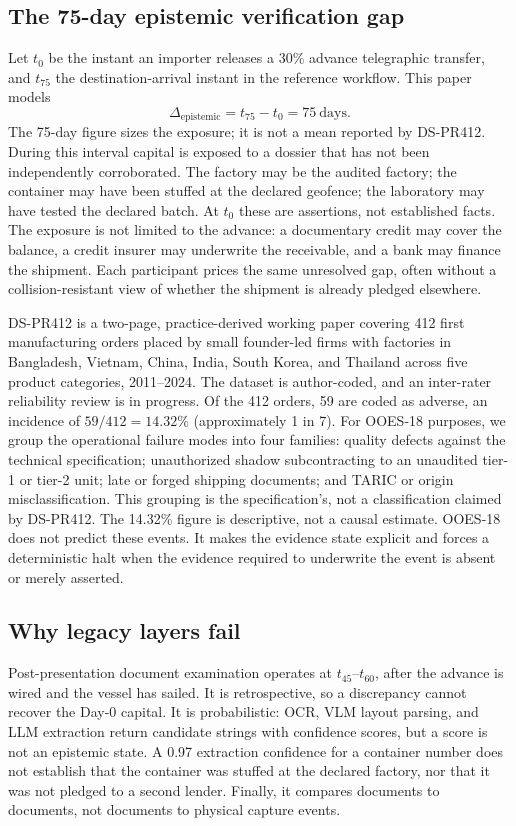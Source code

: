 \documentclass[10pt,twocolumn,a4paper]{article}
\begin{document}
\subsection{The 75-day epistemic verification gap}
Let $t_0$ be the instant an importer releases a 30\% advance telegraphic transfer, and $t_{75}$ the destination-arrival instant in the reference workflow. This paper models
\begin{equation}
\Delta_{\mathrm{epistemic}}=t_{75}-t_{0}=75\ \text{days}.
\end{equation}
The 75-day figure sizes the exposure; it is not a mean reported by DS-PR412. During this interval capital is exposed to a dossier that has not been independently corroborated. The factory may be the audited factory; the container may have been stuffed at the declared geofence; the laboratory may have tested the declared batch. At $t_0$ these are assertions, not established facts. The exposure is not limited to the advance: a documentary credit may cover the balance, a credit insurer may underwrite the receivable, and a bank may finance the shipment. Each participant prices the same unresolved gap, often without a collision-resistant view of whether the shipment is already pledged elsewhere.

DS-PR412 is a two-page, practice-derived working paper covering 412 first manufacturing orders placed by small founder-led firms with factories in Bangladesh, Vietnam, China, India, South Korea, and Thailand across five product categories, 2011--2024. The dataset is author-coded, and an inter-rater reliability review is in progress. Of the 412 orders, 59 are coded as adverse, an incidence of $59/412=14.32\%$ (approximately 1 in 7). For OOES-18 purposes, we group the operational failure modes into four families: quality defects against the technical specification; unauthorized shadow subcontracting to an unaudited tier-1 or tier-2 unit; late or forged shipping documents; and TARIC or origin misclassification. This grouping is the specification's, not a classification claimed by DS-PR412. The 14.32\% figure is descriptive, not a causal estimate. OOES-18 does not predict these events. It makes the evidence state explicit and forces a deterministic halt when the evidence required to underwrite the event is absent or merely asserted.

\subsection{Why legacy layers fail}
Post-presentation document examination operates at $t_{45}$--$t_{60}$, after the advance is wired and the vessel has sailed. It is retrospective, so a discrepancy cannot recover the Day-0 capital. It is probabilistic: OCR, VLM layout parsing, and LLM extraction return candidate strings with confidence scores, but a score is not an epistemic state. A 0.97 extraction confidence for a container number does not establish that the container was stuffed at the declared factory, nor that it was not pledged to a second lender. Finally, it compares documents to documents, not documents to physical capture events.
\end{document}
